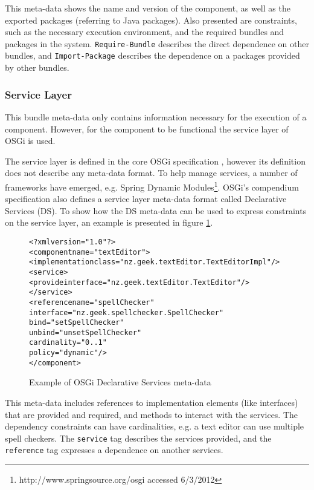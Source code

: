 This meta-data shows the name and version of the component, as well as the exported packages (referring to Java packages).
Also presented are constraints, such as the necessary execution environment, and the required bundles and packages in the system.
\texttt{Require-Bundle} describes the direct dependence on other bundles, and
\texttt{Import-Package} describes the dependence on a packages provided by other bundles.

\subsubsection{Service Layer}
This bundle meta-data only contains information necessary for the execution of a component.
However, for the component to be functional the service layer of OSGi is used.

The service layer is defined in the core OSGi specification \citep{osgicore2007}, however its definition does not describe any meta-data format.
To help manage services, a number of frameworks have emerged, e.g.
Spring Dynamic Modules\footnote{http://www.springsource.org/osgi accessed 6/3/2012}.
OSGi's compendium specification \citep{osgicompendium2007} also defines a service layer meta-data format called Declarative Services (DS).
To show how the DS meta-data can be used to express constraints on the service layer,
an example is presented in figure \ref{dsmetadata}.

\begin{figure}[htp]
\begin{center}
\begin{framed}
\begin{alltt}
<?xml version="1.0"?>
<component name="textEditor">
    <implementation class="nz.geek.textEditor.TextEditorImpl"/>
    <service>
        <provide interface="nz.geek.textEditor.TextEditor"/>
    </service>
    <reference name="spellChecker"
        interface="nz.geek.spellchecker.SpellChecker"
        bind="setSpellChecker"
        unbind="unsetSpellChecker"
        cardinality="0..1"
        policy="dynamic"/>
</component>
\end{alltt}
\end{framed}
  \caption{Example of OSGi Declarative Services meta-data}
  \label{dsmetadata}
\end{center}
\end{figure}

This meta-data includes references to implementation elements (like interfaces) that are provided and required, and methods to interact with the services.
The dependency constraints can have cardinalities, e.g. a text editor can use multiple spell checkers.
The \texttt{service} tag describes the services provided, and the \texttt{reference} tag expresses a dependence on another services.

